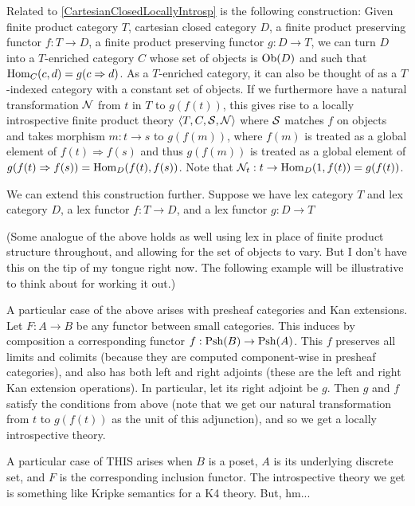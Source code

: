 \begin{TODOblock}
Related to \cref{CartesianClosedLocallyIntrosp} is the following construction: Given finite product category $T$, cartesian closed category $D$, a finite product preserving functor $f : T \to D$, a finite product preserving functor $g: D \to T$, we can turn $D$ into a $T$-enriched category $C$ whose set of objects is $\operatorname{Ob}(D)$ and such that $\operatorname{Hom}_C(c, d) = g(c \Rightarrow d)$. As a $T$-enriched category, it can also be thought of as a $T$-indexed category with a constant set of objects. If we furthermore have a natural transformation $\mathcal{N}$ from $t$ in $T$ to $g(f(t))$, this gives rise to a locally introspective finite product theory $\langle T, C, \mathcal{S}, \mathcal{N} \rangle$ where $\mathcal{S}$ matches $f$ on objects and takes morphism $m : t \to s$ to $g(f(m))$, where $f(m)$ is treated as a global element of $f(t) \Rightarrow f(s)$ and thus $g(f(m))$ is treated as a global element of $g(f(t) \Rightarrow f(s)) = \operatorname{Hom}_D(f(t), f(s))$. Note that $\mathcal{N}_t : t \to \operatorname{Hom}_D(1, f(t)) = g(f(t))$.

We can extend this construction further. Suppose we have lex category $T$ and lex category $D$, a lex functor $f: T \to D$, and a lex functor $g: D \to T$

(Some analogue of the above holds as well using lex in place of finite product structure throughout, and allowing for the set of objects to vary. But I don't have this on the tip of my tongue right now. The following example will be illustrative to think about for working it out.)

A particular case of the above arises with presheaf categories and Kan extensions. Let $F : A \to B$ be any functor between small categories. This induces by composition a corresponding functor $f : \operatorname{Psh}(B) \to \operatorname{Psh}(A)$. This $f$ preserves all limits and colimits (because they are computed component-wise in presheaf categories), and also has both left and right adjoints (these are the left and right Kan extension operations). In particular, let its right adjoint be $g$. Then $g$ and $f$ satisfy the conditions from above (note that we get our natural transformation from $t$ to $g(f(t))$ as the unit of this adjunction), and so we get a locally introspective theory.

A particular case of THIS arises when $B$ is a poset, $A$ is its underlying discrete set, and $F$ is the corresponding inclusion functor. The introspective theory we get is something like Kripke semantics for a K4 theory. But, hm...


\end{TODOblock}
